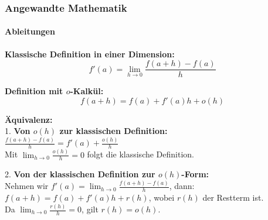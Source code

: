 \documentclass{beamer}
\begin{document}
\begin{frame}
    \frametitle{Angewandte Mathematik}
    \framesubtitle{Ableitungen}
    \textbf{Klassische Definition in einer Dimension:}
    \[
    f'(a) = \lim_{h \to 0} \frac{f(a + h) - f(a)}{h}
    \]
    
    \textbf{Definition mit \( o \)-Kalkül:}
    \[
    f(a + h) = f(a) + f'(a)h + o(h)
    \]
  
    \textbf{Äquivalenz:} \\
    \vspace{0.2cm}
    1. \textbf{Von \( o(h) \) zur klassischen Definition:} \\
    \quad \( \frac{f(a + h) - f(a)}{h} = f'(a) + \frac{o(h)}{h} \) \\
    \quad Mit \( \lim_{h \to 0} \frac{o(h)}{h} = 0 \) folgt die klassische Definition.
    
    \vspace{0.3cm}
    2. \textbf{Von der klassischen Definition zur \( o(h) \)-Form:} \\
    \quad Nehmen wir \( f'(a) = \lim_{h \to 0} \frac{f(a + h) - f(a)}{h} \), dann: \\
    \quad \( f(a + h) = f(a) + f'(a)h + r(h) \), wobei \( r(h) \) der Restterm ist. \\
    \quad Da \( \lim_{h \to 0} \frac{r(h)}{h} = 0 \), gilt \( r(h) = o(h) \).
    
  \end{frame}
  
\end{document}
